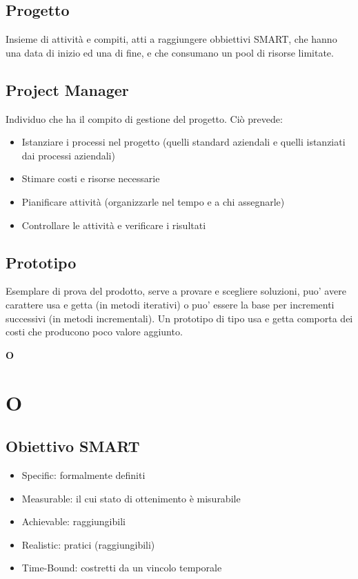 	\subsection{Progetto}
	\label{sec:progetto}
	Insieme di attività e compiti, atti a raggiungere obbiettivi SMART, che hanno una data di inizio ed una di fine, e che consumano un pool di risorse limitate.	
	
	\subsection{Project Manager}
	\label{sec:projectmanager}
	Individuo che ha il compito di gestione del progetto. Ciò prevede:
	\begin{itemize}  
	\item Istanziare i processi nel progetto (quelli standard aziendali e quelli istanziati dai processi aziendali)
	\item Stimare costi e risorse necessarie
	\item Pianificare attività (organizzarle nel tempo e a chi assegnarle)
	\item Controllare le attività e verificare i risultati
	\end{itemize}	
		
	\subsection{Prototipo}
	\label{sec:prototipo}
	Esemplare di prova del prodotto, serve a provare e scegliere soluzioni, puo' avere carattere usa e getta (in metodi iterativi) 
	o puo' essere la base per incrementi successivi (in metodi incrementali).
	Un prototipo di tipo usa e getta comporta dei costi che producono poco valore aggiunto.\newpage	

	{\Huge{\textbf{O}}} \\
	\section{O}
		
	\subsection{Obiettivo SMART}
	\label{sec:smart}
	\begin{itemize}  
	\item Specific: formalmente definiti
	\item Measurable: il cui stato di ottenimento è misurabile
	\item Achievable: raggiungibili
	\item Realistic: pratici (raggiungibili)
	\item Time-Bound: costretti da un vincolo temporale
	\end{itemize}\newpage

